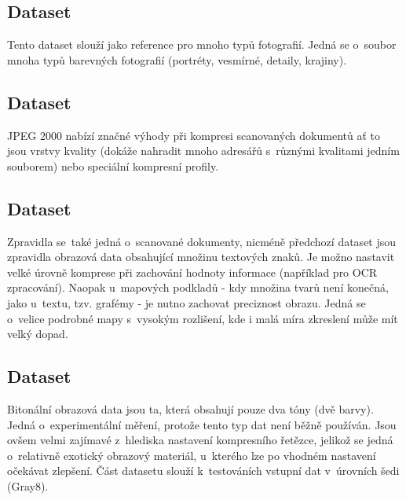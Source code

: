 \subsection*{Dataset }
Tento dataset slouží jako reference pro mnoho typů fotografií. Jedná se o~soubor mnoha typů barevných fotografií (portréty, vesmírné, detaily, krajiny).

\subsection*{Dataset }
JPEG 2000 nabízí značné výhody při kompresi scanovaných dokumentů ať to jsou vrstvy kvality (dokáže nahradit mnoho adresářů s~různými kvalitami jedním souborem) nebo speciální kompresní profily.

\subsection*{Dataset }
Zpravidla se~také jedná o~scanované dokumenty, nicméně předchozí dataset jsou zpravidla obrazová data obsahující množinu textových znaků. Je možno nastavit velké úrovně komprese při zachování hodnoty informace (například pro OCR zpracování). Naopak u~mapových podkladů - kdy množina tvarů není konečná, jako u~textu, tzv. grafémy - je nutno zachovat preciznost obrazu. Jedná se o~velice podrobné mapy s~vysokým rozlišení, kde i malá míra zkreslení může mít velký dopad.

\subsection*{Dataset }
Bitonální obrazová data jsou ta, která obsahují pouze dva tóny (dvě barvy). Jedná o~experimentální měření, protože tento typ dat není běžně používán. Jsou ovšem velmi zajímavé z~hlediska nastavení kompresního řetězce, jelikož se jedná o~relativně exotický obrazový materiál, u~kterého lze po vhodném nastavení očekávat zlepšení. Část datasetu slouží k~testováních vstupní dat v~úrovních šedi (Gray8).


